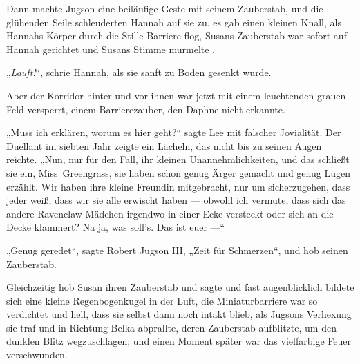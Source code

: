 Dann machte Jugson eine beiläufige Geste mit seinem Zauberstab, und die glühenden Seile schleuderten Hannah auf sie zu, es gab einen kleinen Knall, als Hannahs Körper durch die Stille-Barriere flog, Susans Zauberstab war sofort auf Hannah gerichtet und Susans Stimme murmelte .

„\emph{Lauft!}“, schrie Hannah, als sie sanft zu Boden gesenkt wurde.

Aber der Korridor hinter und vor ihnen war jetzt mit einem leuchtenden grauen Feld versperrt, einem Barrierezauber, den Daphne nicht erkannte.

„Muss ich erklären, worum es hier geht?“ sagte Lee mit falscher Jovialität. Der Duellant im siebten Jahr zeigte ein Lächeln, das nicht bis zu seinen Augen reichte.
„Nun, nur für den Fall, ihr kleinen Unannehmlichkeiten, und das schließt sie ein, Miss~Greengrass, sie haben schon genug Ärger gemacht und genug Lügen erzählt. Wir haben ihre kleine Freundin mitgebracht, nur um sicherzugehen, dass jeder weiß, dass wir sie alle erwischt haben — obwohl ich vermute, dass sich das andere Ravenclaw-Mädchen irgendwo in einer Ecke versteckt oder sich an die Decke klammert? Na ja, was soll’s. Das ist euer —“

„Genug geredet“, sagte Robert Jugson III,
„Zeit für Schmerzen“, und hob seinen Zauberstab. 

Gleichzeitig hob Susan ihren Zauberstab und sagte  und fast augenblicklich bildete sich eine kleine Regenbogenkugel in der Luft, die Miniaturbarriere war so verdichtet und hell, dass sie selbst dann noch intakt blieb, als Jugsons Verhexung sie traf und in Richtung Belka abprallte, deren Zauberstab aufblitzte, um den dunklen Blitz wegzuschlagen; und einen Moment später war das vielfarbige Feuer verschwunden.

